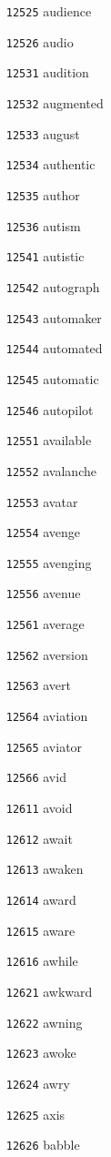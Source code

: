 \documentclass[twoside,11pt]{article}
\begin{document}
\begin{multicols}{5}
\begin{enumerate}
\item[\texttt{12525}] audience
\item[\texttt{12526}] audio
\item[\texttt{12531}] audition
\item[\texttt{12532}] augmented
\item[\texttt{12533}] august
\item[\texttt{12534}] authentic
\item[\texttt{12535}] author
\item[\texttt{12536}] autism
\item[\texttt{12541}] autistic
\item[\texttt{12542}] autograph
\item[\texttt{12543}] automaker
\item[\texttt{12544}] automated
\item[\texttt{12545}] automatic
\item[\texttt{12546}] autopilot
\item[\texttt{12551}] available
\item[\texttt{12552}] avalanche
\item[\texttt{12553}] avatar
\item[\texttt{12554}] avenge
\item[\texttt{12555}] avenging
\item[\texttt{12556}] avenue
\item[\texttt{12561}] average
\item[\texttt{12562}] aversion
\item[\texttt{12563}] avert
\item[\texttt{12564}] aviation
\item[\texttt{12565}] aviator
\item[\texttt{12566}] avid
\item[\texttt{12611}] avoid
\item[\texttt{12612}] await
\item[\texttt{12613}] awaken
\item[\texttt{12614}] award
\item[\texttt{12615}] aware
\item[\texttt{12616}] awhile
\item[\texttt{12621}] awkward
\item[\texttt{12622}] awning
\item[\texttt{12623}] awoke
\item[\texttt{12624}] awry
\item[\texttt{12625}] axis
\item[\texttt{12626}] babble

\end{enumerate}
\end{multicols}
\end{document}
